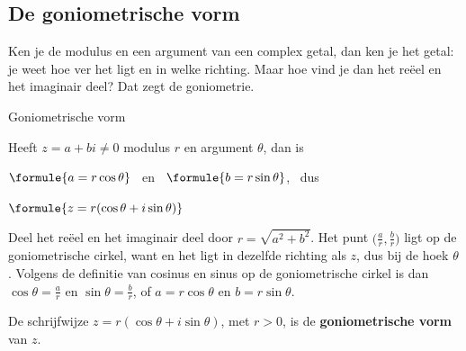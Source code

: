 \begin{oefeningen}
\end{oefeningen}

\subsection{De goniometrische vorm}

Ken je de modulus en een argument van een complex getal, dan ken je het getal: je weet hoe ver het ligt en in welke richting. Maar hoe vind je dan het reëel en het imaginair deel? Dat zegt de goniometrie.

\begin{theorie}
\begin{stelling}{Goniometrische vorm}
\begin{minipage}[t]{.6\linewidth}
\vspace{0pt}
Heeft $z = a + bi \neq 0$ modulus $r$ en argument $\theta$, dan is

\vspace{1mm}
\qquad $\formule{a = r\cos\theta}$ \ en \ $\formule{b = r\sin\theta}$, \ dus

\vspace{1mm}
\qquad $\formule{z = r(\cos\theta + i\sin\theta)}$
\end{minipage}\hfill
\begin{minipage}[t]{.36\linewidth}
\vspace{0pt}
\end{minipage}
\end{stelling}

\begin{bewijs}
Deel het reëel en het imaginair deel door $r = \sqrt{a^2 + b^2}$. Het punt $\bigl(\frac{a}{r}, \frac{b}{r}\bigr)$ ligt op de goniometrische cirkel, want
en het ligt in dezelfde richting als $z$, dus bij de hoek $\theta$. Volgens de definitie van cosinus en sinus op de goniometrische cirkel is dan $\cos\theta = \frac{a}{r}$ en $\sin\theta = \frac{b}{r}$, of $a = r\cos\theta$ en $b = r\sin\theta$.
\end{bewijs}

De schrijfwijze $z = r(\cos\theta + i\sin\theta)$, met $r > 0$, is de \textbf{\textcolor{accent}{goniometrische vorm}} van $z$.
\end{theorie}

